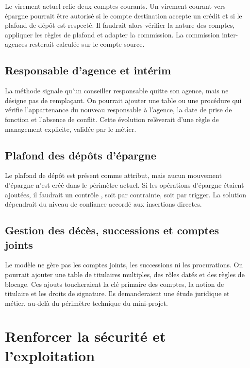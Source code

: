 Le virement actuel relie deux comptes courants. Un virement courant vers
épargne pourrait être autorisé si le compte destination accepte un crédit et si
le plafond de dépôt est respecté. Il faudrait alors vérifier la nature des
comptes, appliquer les règles de plafond et adapter la commission. La
commission inter-agences resterait calculée sur le compte source.

\subsection{Responsable d'agence et intérim}

La méthode  signale qu'un conseiller responsable quitte son
agence, mais ne désigne pas de remplaçant. On pourrait ajouter une table
 ou une procédure  qui vérifie
l'appartenance du nouveau responsable à l'agence, la date de prise de fonction
et l'absence de conflit. Cette évolution relèverait d'une règle de management
explicite, validée par le métier.

\subsection{Plafond des dépôts d'épargne}

Le plafond de dépôt est présent comme attribut, mais aucun mouvement d'épargne
n'est créé dans le périmètre actuel. Si les opérations d'épargne étaient
ajoutées, il faudrait un contrôle ,
soit par contrainte, soit par trigger. La solution dépendrait du niveau de
confiance accordé aux insertions directes.

\subsection{Gestion des décès, successions et comptes joints}

Le modèle ne gère pas les comptes joints, les successions ni les procurations.
On pourrait ajouter une table de titulaires multiples, des rôles datés et des
règles de blocage. Ces ajouts toucheraient la clé primaire des comptes, la
notion de titulaire et les droits de signature. Ils demanderaient une étude
juridique et métier, au-delà du périmètre technique du mini-projet.

\section{Renforcer la sécurité et l'exploitation}

